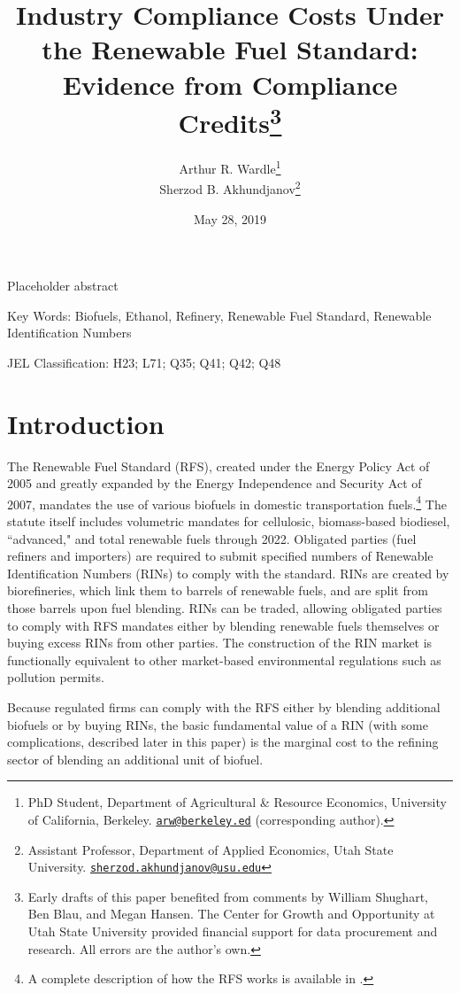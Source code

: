 \documentclass[11pt]{article}
\title{{\Large \bf Industry Compliance Costs Under the Renewable Fuel Standard: Evidence from Compliance Credits\thanks{Early drafts of this paper benefited from comments by William Shughart, Ben Blau, and Megan Hansen. The Center for Growth and Opportunity at Utah State University provided financial support for data procurement and research. All errors are the author's own.}}}
\author{Arthur R. Wardle\footnote{
PhD Student, Department of Agricultural \& Resource Economics, University of California, Berkeley. \href{mailto:arw@berkeley.edu}{\tt arw@berkeley.ed} (corresponding author).}\\
Sherzod B. Akhundjanov\footnote{Assistant Professor, Department of Applied Economics, Utah State University. \href{matilto:sherzod.akhundjanov@usu.edu}{\tt sherzod.akhundjanov@usu.edu}}}
\date{May 28, 2019}
\begin{document}
\maketitle

Placeholder abstract
\newline

{\small
Key Words: Biofuels, Ethanol, Refinery, Renewable Fuel Standard, Renewable Identification Numbers

JEL Classification: H23; L71; Q35; Q41; Q42; Q48}
\newpage

\section{Introduction}

The Renewable Fuel Standard (RFS), created under the Energy Policy Act of 2005 and greatly expanded by the Energy Independence and Security Act of 2007, mandates the use of various biofuels in domestic transportation fuels.\footnote{A complete description of how the RFS works is available in \cite{Schnepf2013}.} The statute itself includes volumetric mandates for cellulosic, biomass-based biodiesel, ``advanced," and total renewable fuels through 2022. Obligated parties (fuel refiners and importers) are required to submit specified numbers of Renewable Identification Numbers (RINs) to comply with the standard. RINs are created by biorefineries, which link them to barrels of renewable fuels, and are split from those barrels upon fuel blending. RINs can be traded, allowing obligated parties to comply with RFS mandates either by blending renewable fuels themselves or buying excess RINs from other parties. The construction of the RIN market is functionally equivalent to other market-based environmental regulations such as pollution permits. 

Because regulated firms can comply with the RFS either by blending additional biofuels or by buying RINs, the basic fundamental value of a RIN (with some complications, described later in this paper) is the marginal cost to the refining sector of blending an additional unit of biofuel. 
\end{document}
